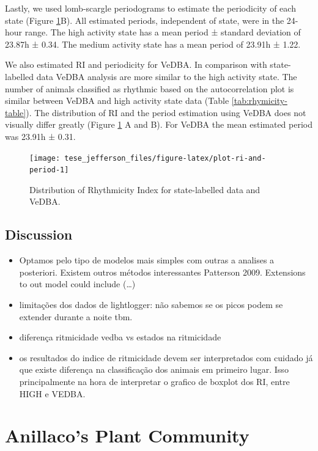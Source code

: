 \documentclass[english,msc,numbers,hidelinks]{coppe}
\providecommand{\tightlist}{%
  \setlength{\itemsep}{0pt}\setlength{\parskip}{0pt}}
\begin{document}
  Lastly, we used lomb-scargle periodograms to estimate the periodicity of each state (Figure \ref{fig:plot-ri-and-period}B). All estimated periods, independent of state, were in the 24-hour range. The high activity state has a mean period ± standard deviation of 23.87h ± 0.34. The medium activity state has a mean period of 23.91h ± 1.22.

  We also estimated RI and periodicity for VeDBA. In comparison with state-labelled data VeDBA analysis are more similar to the high activity state. The number of animals classified as rhythmic based on the autocorrelation plot is similar between VeDBA and high activity state data (Table \ref{tab:rhymicity-table}). The distribution of RI and the period estimation using VeDBA does not visually differ greatly (Figure \ref{fig:plot-ri-and-period} A and B). For VeDBA the mean estimated period was 23.91h ± 0.31. \newline
  \begin{figure}[H]

  {\centering \texttt{[image: tese\_jefferson\_files/figure-latex/plot-ri-and-period-1]} 

  }

  \caption{Distribution of Rhythmicity Index for state-labelled data and VeDBA.}\label{fig:plot-ri-and-period}
  \end{figure}
  \newpage

  \hypertarget{discussion}{%
  \section{Discussion}\label{discussion}}
  \begin{itemize}
  \tightlist
  \item
    Optamos pelo tipo de modelos mais simples com outras a analises a posteriori. Existem outros métodos interessantes Patterson 2009. Extensions to out model could include (\ldots)
  \item
    limitações dos dados de lightlogger: não sabemos se os picos podem se extender durante a noite tbm.
  \item
    diferença ritmicidade vedba vs estados na ritmicidade
  \item
    os resultados do indice de ritmicidade devem ser interpretados com cuidado já que existe diferença na classificação dos animais em primeiro lugar. Isso principalmente na hora de interpretar o grafico de boxplot dos RI, entre HIGH e VEDBA.
  \end{itemize}
  \hypertarget{anillacos-plant-community}{%
  \chapter{Anillaco's Plant Community}\label{anillacos-plant-community}}
\end{document}
